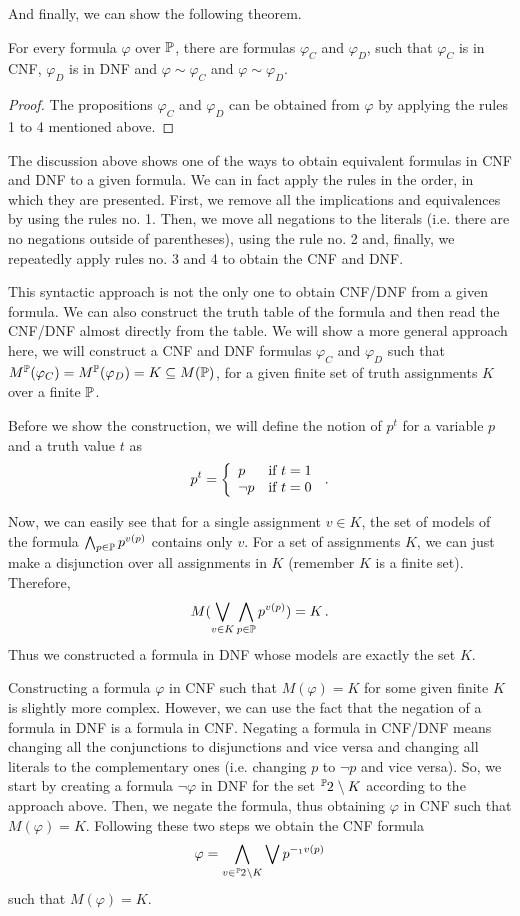 And finally, we can show the following theorem. 

\begin{theorem}
For every formula $\varphi$ over $\mathbb{P}$, there are formulas $\varphi_C$ and $\varphi_D$, such that $\varphi_C$ is in CNF, $\varphi_D$ is in DNF and $\varphi \sim \varphi_C$ and $\varphi \sim \varphi_D$.
\end{theorem}
\begin{proof}
The propositions $\varphi_C$ and $\varphi_D$ can be obtained from $\varphi$ by applying the rules 1 to 4 mentioned above. 
\end{proof}

The discussion above shows one of the ways to obtain equivalent formulas in CNF and DNF to a given formula. We can in fact apply the rules in the order, in which they are presented. First, we remove all the implications and equivalences by using the rules no. 1. Then, we move all negations to the literals (i.e. there are no negations outside of parentheses), using the rule no. 2 and, finally, we repeatedly apply rules no. 3 and 4 to obtain the CNF and DNF. 

This syntactic approach is not the only one to obtain CNF/DNF from a given formula. We can also construct the truth table of the formula and then read the CNF/DNF almost directly from the table. We will show a more general approach here, we will construct a CNF and DNF formulas $\varphi_C$ and $\varphi_D$ such that $M^\mathbb{P}(\varphi_C) = M^\mathbb{P}(\varphi_D) = K \subseteq M(\mathbb{P})$, for a given finite set of truth assignments $K$ over a finite $\mathbb{P}$.

Before we show the construction, we will define the notion of $p^t$ for a variable $p$ and a truth value $t$ as $$ p^t = \left\{ \begin{array}{ll} p & \text{if } t = 1 \\ \neg p & \text{if } t = 0 \end{array} \right.\,.$$ 

Now, we can easily see that for a single assignment $v \in K$, the set of models of the formula $\bigwedge_{p \in \mathbb{P}} p^{v(p)}$ contains only $v$. For a set of assignments $K$, we can just make a disjunction over all assignments in $K$ (remember $K$ is a finite set). Therefore, $$M(\bigvee_{v \in K}\bigwedge_{p \in \mathbb{P}}p^{v(p)}) = K\,.$$ Thus we constructed a formula in DNF whose models are exactly the set $K$. 

Constructing a formula $\varphi$ in CNF such that $M(\varphi) = K$ for some given finite $K$ is slightly more complex. However, we can use the fact that the negation of a formula in DNF is a formula in CNF. Negating a formula in CNF/DNF means changing all the conjunctions to disjunctions and vice versa and changing all literals to the complementary ones (i.e. changing $p$ to $\neg p$ and vice versa). So, we start by creating a formula $\neg \varphi$ in DNF for the set $\fset{\Prop}{2} \setminus K$ according to the approach above. Then, we negate the formula, thus obtaining $\varphi$ in CNF such that $M(\varphi)=K$. Following these two steps we obtain the CNF formula $$\varphi = \Land_{v \in \fset{\Prop}{2} \setminus K}\Lor p^{-_1v(p)}$$ such that $M(\varphi) = K$.

